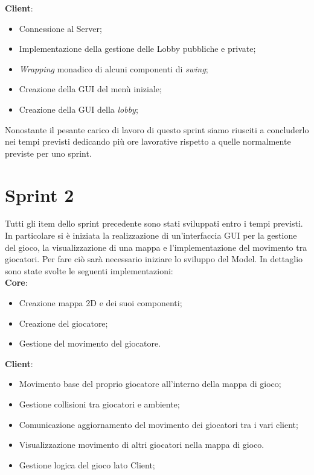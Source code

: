 \textbf{Client}:
\begin{itemize}
    \item Connessione al Server;
    \item Implementazione della gestione delle Lobby pubbliche e private;
    \item \textit{Wrapping} monadico di alcuni componenti di \textit{swing};
    \item Creazione della GUI del men\`u iniziale;
    \item Creazione della GUI della \textit{lobby};
\end{itemize}
Nonostante il pesante carico di lavoro di questo sprint siamo riusciti a concluderlo nei tempi previsti dedicando più ore lavorative rispetto a quelle normalmente previste per uno sprint.

\section{Sprint 2}
Tutti gli item dello sprint precedente sono stati sviluppati entro i tempi previsti.\\
In particolare si \`e iniziata la realizzazione di un'interfaccia GUI per la gestione del gioco, la visualizzazione di una mappa e l'implementazione del movimento tra giocatori. Per fare ciò sar\`a necessario iniziare lo sviluppo del Model.
In dettaglio sono state svolte le seguenti implementazioni:\\

\textbf{Core}:
\begin{itemize}
    \item Creazione mappa 2D e dei suoi componenti;
    \item Creazione del giocatore;
    \item Gestione del movimento del giocatore.
\end{itemize}

\textbf{Client}:
\begin{itemize}
    \item Movimento base del proprio giocatore all'interno della mappa di gioco;
    \item Gestione collisioni tra giocatori e ambiente;
    \item Comunicazione aggiornamento del movimento dei giocatori tra i vari client;
    \item Visualizzazione movimento di altri giocatori nella mappa di gioco.
    \item Gestione logica del gioco lato Client;
\end{itemize}

